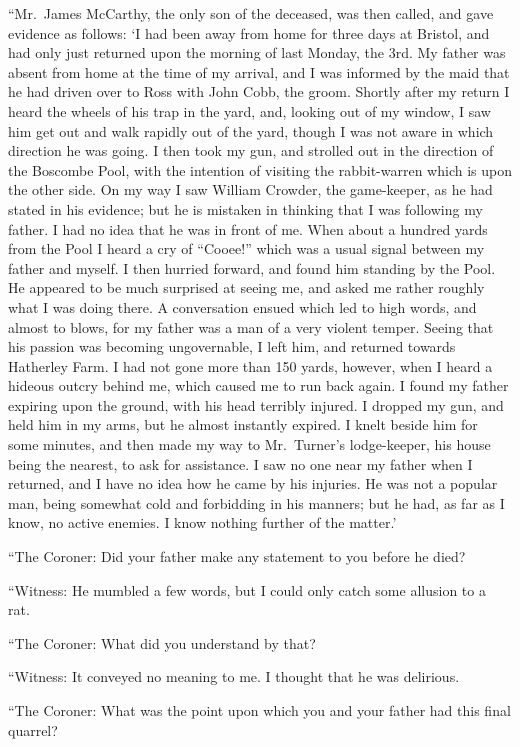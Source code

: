 “Mr.~James McCarthy, the only son of the deceased, was
then called, and gave evidence as follows: ‘I had been
away from home for three days at Bristol, and had only just
returned upon the morning of last Monday, the 3rd. My father
was absent from home at the time of my arrival, and I
was informed by the maid that he had driven over to Ross
with John Cobb, the groom. Shortly after my return I heard
the wheels of his trap in the yard, and, looking out of my window,
I saw him get out and walk rapidly out of the yard,
though I was not aware in which direction he was going. I
then took my gun, and strolled out in the direction of the
Boscombe Pool, with the intention of visiting the rabbit-warren
which is upon the other side. On my way I saw William
Crowder, the game-keeper, as he had stated in his evidence;
but he is mistaken in thinking that I was following my father.
I had no idea that he was in front of me. When about a
hundred yards from the Pool I heard a cry of “Cooee!”
which was a usual signal between my father and myself. I
then hurried forward, and found him standing by the Pool.
He appeared to be much surprised at seeing me, and asked
me rather roughly what I was doing there. A conversation
ensued which led to high words, and almost to blows, for my
father was a man of a very violent temper. Seeing that his
passion was becoming ungovernable, I left him, and returned
towards Hatherley Farm. I had not gone more than 150
yards, however, when I heard a hideous outcry behind me,
which caused me to run back again. I found my father expiring
upon the ground, with his head terribly injured. I
dropped my gun, and held him in my arms, but he almost instantly
expired. I knelt beside him for some minutes, and
then made my way to Mr.~Turner’s lodge-keeper, his house
being the nearest, to ask for assistance. I saw no one near
my father when I returned, and I have no idea how he came
by his injuries. He was not a popular man, being somewhat
cold and forbidding in his manners; but he had, as far as I
know, no active enemies. I know nothing further of the
matter.’

“The Coroner: Did your father make any statement to you
before he died?

“Witness: He mumbled a few words, but I could only catch
some allusion to a rat.

“The Coroner: What did you understand by that?

“Witness: It conveyed no meaning to me. I thought that
he was delirious.

“The Coroner: What was the point upon which you and
your father had this final quarrel?

